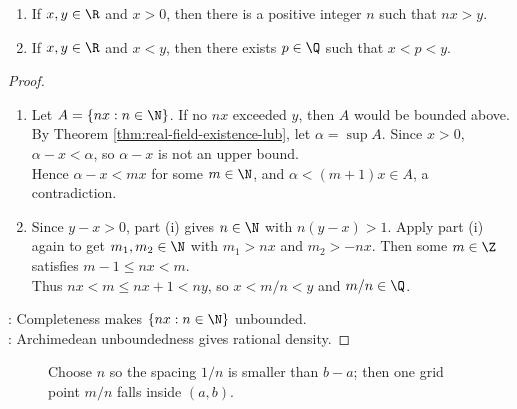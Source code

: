 \begin{theorem} \label{thm:archimedean-and-rational-density} 
\begin{enumerate}[label=(\roman*)]
\setlength{\itemsep}{0pt}
\item If $x,y\in\R$ and $x>0$, then there is a positive integer $n$ such that $nx>y$.
\item If $x,y\in\R$ and $x<y$, then there exists $p\in\Q$ such that $x<p<y$.
\end{enumerate}
\begin{proof}
\begin{enumerate}[label=(\roman*)]
\setlength{\itemsep}{0pt}
\item Let $A=\{nx:n\in\N\}$. If no $nx$ exceeded $y$, then $A$ would be bounded above. By Theorem \ref{thm:real-field-existence-lub}, let $\alpha=\sup A$. Since $x>0$, $\alpha-x<\alpha$, so $\alpha-x$ is not an upper bound.\\
Hence $\alpha-x<mx$ for some $m\in\N$, and $\alpha<(m+1)x\in A$, a contradiction.
\item Since $y-x>0$, part (i) gives $n\in\N$ with $n(y-x)>1$. Apply part (i) again to get $m_1,m_2\in\N$ with $m_1>nx$ and $m_2>-nx$. Then some $m\in\Z$ satisfies $m-1\leq nx<m$.\\
Thus $nx<m\leq nx+1<ny$, so $x<m/n<y$ and $m/n\in\Q$.
\end{enumerate}
: Completeness makes $\{nx:n\in\N\}$ unbounded.\\
: Archimedean unboundedness gives rational density.
\end{proof}
\end{theorem}

\begin{figure}[H]
  \centering
  
  \caption{Choose $n$ so the spacing $1/n$ is smaller than $b-a$; then one grid point $m/n$ falls inside $(a,b)$.}
  \label{fig:rational-density-step-size}
\end{figure}

